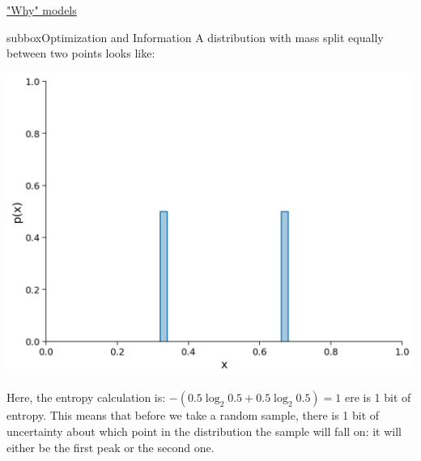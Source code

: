 \begin{textbox}{\href{https://compneuro.neuromatch.io/tutorials/W1D1_ModelTypes/student/W1D1_Tutorial3.html}{"Why" models }  }
\begin{subbox}{subbox}{Optimization and Information}
A distribution with mass split equally between two points looks like:

\begin{center}
    
\includegraphics[scale=0.2]{Figures/MT/MT_Figure7.png}
\end{center}

Here, the entropy calculation is: $-(0.5 \log_2 0.5 + 0.5\log_2 0.5)=1$
ere is 1 bit of entropy. This means that before we take a random sample, there is 1 bit of uncertainty about which point in the distribution the sample will fall on: it will either be the first peak or the second one. 

\end{subbox}
\end{textbox}
